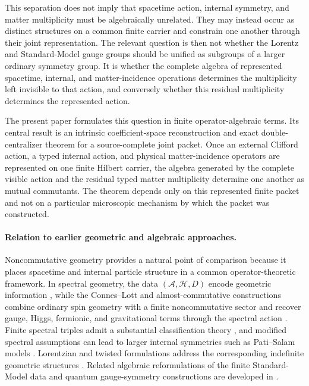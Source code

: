 \documentclass[11pt]{article}
\numberwithin{equation}{section}
\theoremstyle{definition}
\theoremstyle{remark}
\newcommand{\A}{\mathcal A}
\newcommand{\Hh}{\mathcal H}
\begin{document}
This separation does not imply that spacetime action, internal symmetry, and
matter multiplicity must be algebraically unrelated.  They may instead occur
as distinct structures on a common finite carrier and constrain one another
through their joint representation.  The relevant question is then not
whether the Lorentz and Standard-Model gauge groups should be unified as
subgroups of a larger ordinary symmetry group.  It is whether the complete
algebra of represented spacetime, internal, and matter-incidence operations
determines the multiplicity left invisible to that action, and conversely
whether this residual multiplicity determines the represented action.

The present paper formulates this question in finite operator-algebraic terms.
Its central result is an intrinsic coefficient-space reconstruction and
exact double-centralizer theorem for a source-complete joint packet.  Once an external Clifford action, a typed
internal action, and physical matter-incidence operators are represented on
one finite Hilbert carrier, the algebra generated by the complete visible
action and the residual typed matter multiplicity determine one another as
mutual commutants.  The theorem depends only on this represented finite
packet and not on a particular microscopic mechanism by which the packet was
constructed.


\paragraph{Relation to earlier geometric and algebraic approaches.}

Noncommutative geometry provides a natural point of comparison because it
places spacetime and internal particle structure in a common
operator-theoretic framework.  In spectral geometry, the data
$(\A,\Hh,D)$ encode geometric information
\cite{Connes1994,ConnesReality1995}, while the Connes--Lott and
almost-commutative constructions combine ordinary spin geometry with a
finite noncommutative sector and recover gauge, Higgs, fermionic, and
gravitational terms through the spectral action
\cite{ConnesLott1991,ConnesGravityMatter1996,ChamseddineConnes1997,
ChamseddineConnesMarcolli2007,ChamseddineConnes2008,
vanSuijlekom2025}.  Finite spectral triples admit a substantial
classification theory \cite{Krajewski1998,IochumSchuckerStephan2004,
vanDenDungenVanSuijlekom2012}, and modified spectral assumptions can lead to
larger internal symmetries such as Pati--Salam models
\cite{ChamseddineConnesVanSuijlekom2013}.  Lorentzian and twisted
formulations address the corresponding indefinite geometric structures
\cite{Barrett2007,DevastatoEtAl2018}.  Related algebraic reformulations of
the finite Standard-Model data and quantum gauge-symmetry constructions are
developed in \cite{BoyleFarnsworth2018,BhowmickEtAl2014}.
\end{document}
